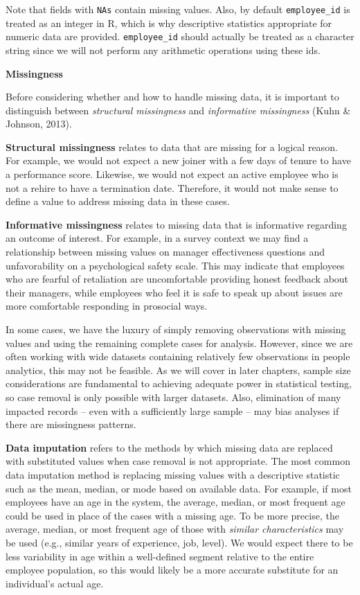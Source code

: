 \documentclass[
]{book}
\begin{document}
Note that fields with \texttt{NA\textquotesingle{}s} contain missing values. Also, by default \texttt{employee\_id} is treated as an integer in R, which is why descriptive statistics appropriate for numeric data are provided. \texttt{employee\_id} should actually be treated as a character string since we will not perform any arithmetic operations using these ids.

\textbf{Missingness}

Before considering whether and how to handle missing data, it is important to distinguish between \emph{structural missingness} and \emph{informative missingness} (Kuhn \& Johnson, 2013).

\textbf{Structural missingness} relates to data that are missing for a logical reason. For example, we would not expect a new joiner with a few days of tenure to have a performance score. Likewise, we would not expect an active employee who is not a rehire to have a termination date. Therefore, it would not make sense to define a value to address missing data in these cases.

\textbf{Informative missingness} relates to missing data that is informative regarding an outcome of interest. For example, in a survey context we may find a relationship between missing values on manager effectiveness questions and unfavorability on a psychological safety scale. This may indicate that employees who are fearful of retaliation are uncomfortable providing honest feedback about their managers, while employees who feel it is safe to speak up about issues are more comfortable responding in prosocial ways.

In some cases, we have the luxury of simply removing observations with missing values and using the remaining complete cases for analysis. However, since we are often working with wide datasets containing relatively few observations in people analytics, this may not be feasible. As we will cover in later chapters, sample size considerations are fundamental to achieving adequate power in statistical testing, so case removal is only possible with larger datasets. Also, elimination of many impacted records -- even with a sufficiently large sample -- may bias analyses if there are missingness patterns.

\textbf{Data imputation} refers to the methods by which missing data are replaced with substituted values when case removal is not appropriate. The most common data imputation method is replacing missing values with a descriptive statistic such as the mean, median, or mode based on available data. For example, if most employees have an age in the system, the average, median, or most frequent age could be used in place of the cases with a missing age. To be more precise, the average, median, or most frequent age of those with \emph{similar characteristics} may be used (e.g., similar years of experience, job, level). We would expect there to be less variability in age within a well-defined segment relative to the entire employee population, so this would likely be a more accurate substitute for an individual's actual age.
\end{document}
